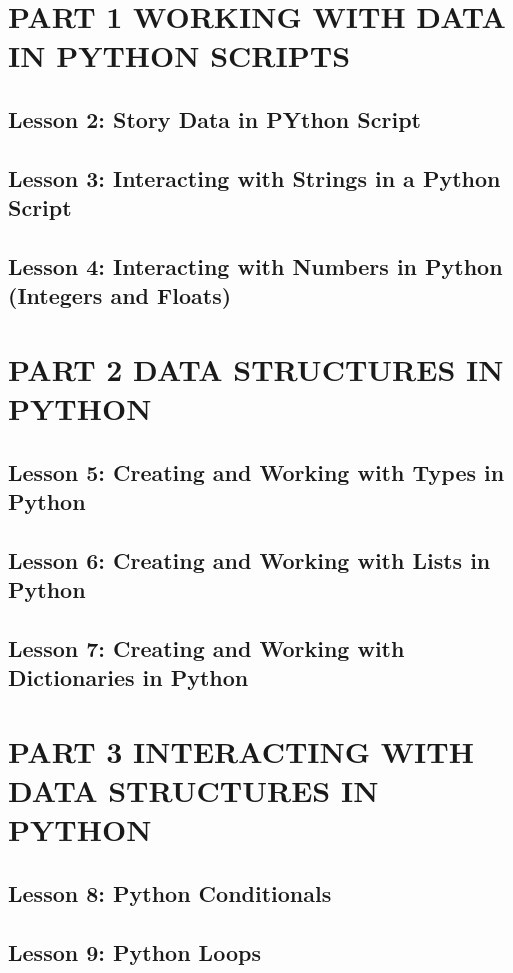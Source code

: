 \documentclass[11pt]{article}
\begin{document}
\section{PART 1 WORKING WITH DATA IN PYTHON SCRIPTS}
\label{sec:orgbde976a}
\subsection{Lesson 2: Story Data in PYthon Script}
\label{sec:org7b779a3}
\subsection{Lesson 3: Interacting with Strings in a Python Script}
\label{sec:org67e6ba0}
\subsection{Lesson 4: Interacting with Numbers in Python (Integers and Floats)}
\label{sec:org3842bc6}
\section{PART 2 DATA STRUCTURES IN PYTHON}
\label{sec:org6501897}
\subsection{Lesson 5: Creating and Working with Types in Python}
\label{sec:org4a95727}
\subsection{Lesson 6: Creating and Working with Lists in Python}
\label{sec:orgdd3d12e}
\subsection{Lesson 7: Creating and Working with Dictionaries in Python}
\label{sec:orge839f23}
\section{PART 3 INTERACTING WITH DATA STRUCTURES IN PYTHON}
\label{sec:org0e17f03}
\subsection{Lesson 8: Python Conditionals}
\label{sec:orgfa2929b}
\subsection{Lesson 9: Python Loops}
\label{sec:org9ca25a4}
\end{document}
